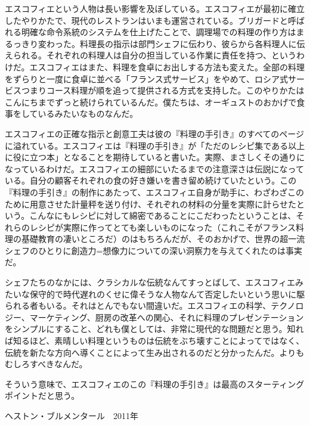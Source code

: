 \begin{Main}
エスコフィエという人物は長い影響を及ぼしている。エスコフィエが最初に確立したやりかたで、現代のレストランはいまも運営されている。ブリガードと呼ばれる明確な命令系統のシステムを仕上げたことで、調理場での料理の作り方はまるっきり変わった。料理長の指示は部門シェフに伝わり、彼らから各料理人に伝えられる。それぞれの料理人は自分の担当している作業に責任を持つ、というわけだ。エスコフィエはまた、料理を食卓にお出しする方法も変えた。全部の料理をずらりと一度に食卓に並べる「フランス式サービス」をやめて、ロシア式サービスつまりコース料理が順を追って提供される方式を支持した。このやりかたはこんにちまでずっと続けられているんだ。僕たちは、オーギュストのおかげで食事をしているみたいなものなんだ。

エスコフィエの正確な指示と創意工夫は彼の『料理の手引き』のすべてのページに溢れている。エスコフィエは『料理の手引き』が「ただのレシピ集である以上に役に立つ本」となることを期待していると書いた。実際、まさしくその通りになっているわけだ。エスコフィエの細部にいたるまでの注意深さは伝説になっている。自分の顧客それぞれの食の好き嫌いを書き留め続けていたという。この『料理の手引き』の制作にあたって、エスコフィエ自身が助手に、わざわざこのために用意させた計量秤を送り付け、それぞれの材料の分量を実際に計らせたという。こんなにもレシピに対して綿密であることにこだわったということは、それらのレシピが実際に作ってとても楽しいものになった（これこそがフランス料理の基礎教育の凄いところだ）のはもちろんだが、そのおかげで、世界の超一流シェフのひとりに創造力=想像力についての深い洞察力を与えてくれたのは事実だ。

シェフたちのなかには、クラシカルな伝統なんてすっとばして、エスコフィエみたいな保守的で時代遅れのくせに偉そうな人物なんて否定したいという思いに駆られる者もいる。それはとんでもない間違いだ。エスコフィエの科学、テクノロジー、マーケティング、厨房の改革への関心、それに料理のプレゼンテーションをシンプルにすること、どれも僕としては、非常に現代的な問題だと思う。知れば知るほど、素晴しい料理というものは伝統をぶち壊すことによってではなく、伝統を新たな方向へ導くことによって生み出されるのだと分かったんだ。よりもむしろすべきなんだ。

\thispagestyle{empty}

そういう意味で、エスコフィエのこの『料理の手引き』は最高のスターティングポイントだと思う。

\vspace{1\zw}
\begin{flushright}
ヘストン・ブルメンタール　2011年
\end{flushright}

\end{Main}

